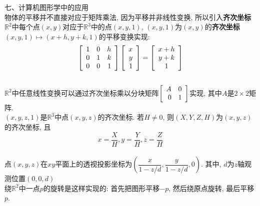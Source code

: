 \documentclass[UTF8,fontset=ubuntu]{ctexart}
\theoremstyle{plain}
\theoremstyle{nonumberplain}
\theoremstyle{empty}
\begin{document}
七、计算机图形学中的应用\\[1ex]
物体的平移并不直接对应于矩阵乘法, 因为平移并非线性变换, 所以引入\textbf{齐次坐标}\\[1ex]
$\mathbb{R}^2$中每个点$(x,y)$对应于$\mathbb{R}^3$中的点$(x,y,1)$, $(x,y,1)$为$(x,y)$的\textbf{齐次坐标}\\[1ex]
$(x,y,1)\mapsto(x+h,y+k,1)$的平移变换实现:\\
\[\left[\begin{array}{r r r}
1 & 0 & h\\
0 & 1 & k\\
0 & 0 & 1
\end{array}\right]
\left[\begin{array}{r}
x\\
y\\
1
\end{array}\right]=
\left[\begin{array}{c}
x+h\\
y+k\\
1
\end{array}\right]\]\\[2ex]
$\mathbb{R}^2$中任意线性变换可以通过齐次坐标乘以分块矩阵$\left[\begin{array}{r r}A & 0\\0 & 1\end{array}\right]$实现, 其中$A$是$2\times 2$矩阵.\\[2ex]
$(x,y,z,1)$是$\mathbb{R}^3$中点$(x,y,z)$的齐次坐标. 若$H\neq 0$, 则$(X,Y,Z,H)$为$(x,y,z)$的齐次坐标, 且
\[x=\frac{X}{H},y=\frac{Y}{H},z=\frac{Z}{H}\]\\[1ex]
点$(x,y,z)$在$xy$平面上的透视投影坐标为$(\dfrac{x}{1-z/d}, \dfrac{y}{1-z/d}, 0)$. 其中, $d$为$z$轴观测位置$(0,0,d)$\\[2ex]
绕$\mathbb{R}^2$中一点$p$的旋转是这样实现的: 首先把图形平移$-p$, 然后绕原点旋转, 最后平移$p$.
\end{document}
